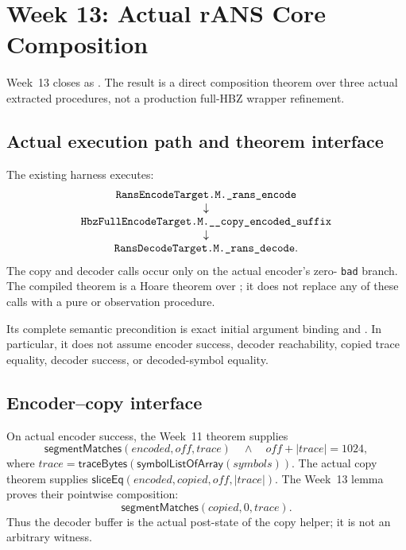 \section{Week 13: Actual rANS Core Composition}

Week~13 closes  as
.  The result is a
direct composition theorem over three actual extracted procedures, not a
production full-HBZ wrapper refinement.

\subsection*{Actual execution path and theorem interface}

The existing  harness executes:
\[
\begin{array}{c}
\procname{RansEncodeTarget.M._rans_encode}\\
\downarrow\\
\procname{HbzFullEncodeTarget.M.__copy_encoded_suffix}\\
\downarrow\\
\procname{RansDecodeTarget.M._rans_decode}.
\end{array}
\]
The copy and decoder calls occur only on the actual encoder's zero-
\texttt{bad} branch.  The compiled theorem
 is a Hoare theorem over
; it does not replace any of these calls
with a pure or observation procedure.

Its complete semantic precondition is exact initial argument binding and
.  In particular, it does
not assume encoder success, decoder reachability, copied trace equality,
decoder success, or decoded-symbol equality.

\subsection*{Encoder--copy interface}

On actual encoder success, the Week~11 theorem supplies
\[
\mathsf{segmentMatches}(encoded,off,trace)
\quad\land\quad off+|trace|=1024,
\]
where
\(trace=\mathsf{traceBytes}(\mathsf{symbolListOfArray}(symbols))\).
The actual copy theorem supplies
\(\mathsf{sliceEq}(encoded,copied,off,|trace|)\).
The Week~13 lemma  proves their
pointwise composition:
\[
\mathsf{segmentMatches}(copied,0,trace).
\]
Thus the decoder buffer is the actual post-state of the copy helper; it is not
an arbitrary witness.

